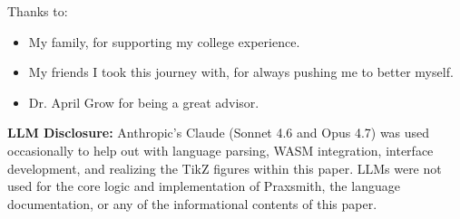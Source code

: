 
\begin{acknowledgments}
    Thanks to:
    \begin{itemize}
        \item My family, for supporting my college experience.
        \item My friends I took this journey with, for always pushing me to better myself.
        \item Dr. April Grow for being a great advisor.
    \end{itemize}

    \vfill
    \textbf{LLM Disclosure:} Anthropic's Claude (Sonnet 4.6 and Opus 4.7) was used
    occasionally to help out with language parsing, WASM integration, interface
    development, and realizing the TikZ figures within this paper. LLMs were
    not used for the core logic and implementation of Praxsmith, the language
    documentation, or any of the informational contents of this paper.
\end{acknowledgments}
